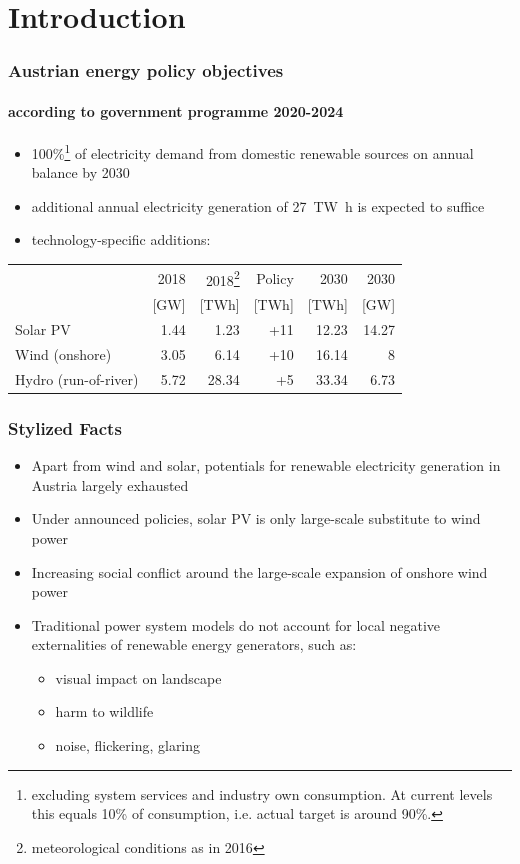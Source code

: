 \documentclass[aspectratio=169, xcolor=dvipsnames]{beamer}
\begin{document}
\section{Introduction}
\begin{frame}
\frametitle{Austrian energy policy objectives}
\framesubtitle{according to government programme 2020-2024}
\begin{itemize}
\item 100\%\footnote[frame]{excluding system services and industry own consumption. At current levels this equals 10\% of consumption, i.e. actual target is around 90\%.} of electricity demand from domestic renewable sources on annual balance by 2030 \pause
\item additional annual electricity generation of \SI{27}{\tera\watt\hour} is expected to suffice \pause
\item technology-specific additions:
\end{itemize}

\begin{table}
\centering
\begin{tabular}{| l | r | r | r | r | r |}
\hline
 & 2018 & 2018\footnote[frame]{meteorological conditions as in 2016} & Policy & 2030 & 2030 \\ 
 & [GW] & [TWh] & [TWh] & [TWh] & [GW] \\ \hline \hline
Solar PV & 1.44 & 1.23 & +11 & 12.23 &  14.27 \\ \hline
Wind (onshore) & 3.05 & 6.14 & +10 & 16.14 & 8 \\ \hline
Hydro (run-of-river) & 5.72 & 28.34 & +5 & 33.34 & 6.73 \\ \hline
\end{tabular}
\end{table}
\end{frame}


\begin{frame}
\frametitle{Stylized Facts}
\begin{itemize}
\item Apart from wind and solar, potentials for renewable electricity generation in Austria largely exhausted
\item Under announced policies, solar PV is only large-scale substitute to wind power
\item Increasing social conflict around the large-scale expansion of onshore wind power
\item Traditional power system models do not account for local negative externalities of renewable energy generators, such as:
	\begin{itemize}
	\item visual impact on landscape
	\item harm to wildlife
	\item noise, flickering, glaring
	\end{itemize}
\end{itemize}
\end{frame}
\end{document}
